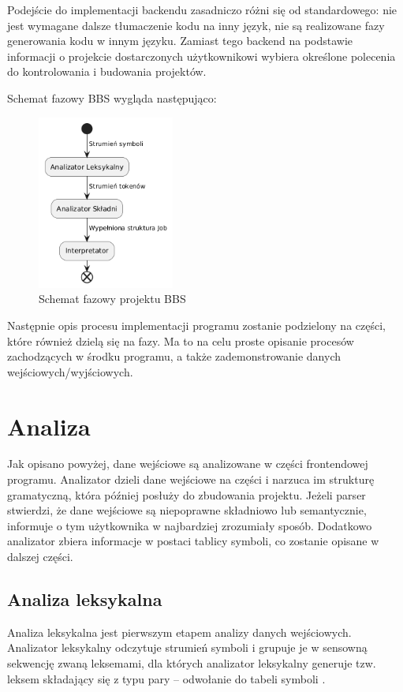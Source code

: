 Podejście do implementacji backendu zasadniczo różni się od standardowego: nie jest wymagane dalsze tłumaczenie kodu na inny język, nie są realizowane fazy generowania kodu w innym języku. Zamiast tego backend na podstawie informacji o projekcie dostarczonych użytkownikowi wybiera określone polecenia do kontrolowania i budowania projektów.

Schemat fazowy BBS wygląda następująco:

\begin{figure}[h]
    \centering
    \includegraphics[width=0.4\textwidth]{Images/phases.png}
    \caption{Schemat fazowy projektu BBS}
\end{figure}

Następnie opis procesu implementacji programu zostanie podzielony na części, które również dzielą się na fazy. Ma to na celu proste opisanie procesów zachodzących w środku programu, a także zademonstrowanie danych wejściowych/wyjściowych.

\section{Analiza}
Jak opisano powyżej, dane wejściowe są analizowane w części frontendowej programu. Analizator dzieli dane wejściowe na części i narzuca im strukturę gramatyczną, która później posłuży do zbudowania projektu. Jeżeli parser stwierdzi, że dane wejściowe są niepoprawne składniowo lub semantycznie, informuje o tym użytkownika w najbardziej zrozumiały sposób. Dodatkowo analizator zbiera informacje w postaci tablicy symboli, co zostanie opisane w dalszej części.

\subsection{Analiza leksykalna}
Analiza leksykalna jest pierwszym etapem analizy danych wejściowych. Analizator leksykalny odczytuje strumień symboli i grupuje je w sensowną sekwencję zwaną leksemami, dla których analizator leksykalny generuje tzw. leksem składający się z typu pary -- odwołanie do tabeli symboli \cite{compilers}.

